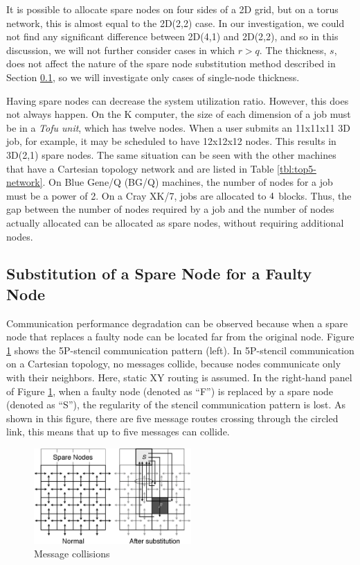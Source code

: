 \documentclass[Afour,times,sagev]{sagej}
\begin{document}
It is possible to allocate spare nodes on four sides of a 2D grid, but
on a torus network, this is almost equal to the 2D(2,2) case. In our
investigation, we could not find any significant difference between
2D(4,1) and 2D(2,2), and so in this discussion, we will not further
consider cases in which $r > q$. The thickness, $s$, does not affect
the nature of the spare node substitution method described in Section
\ref{sec:substitution}, so we will investigate only cases of
single-node thickness.

Having spare nodes can decrease the system utilization ratio. However,
this does not always happen. On the K computer, the size of each
dimension of a job must be in a {\it Tofu unit}, which has twelve
nodes. When a user submits an 11x11x11 3D job, for example, it may be
scheduled to have 12x12x12 nodes. This results in 3D(2,1) spare
nodes. The same situation can be seen with the other machines that
have a Cartesian topology network and are listed in Table
\ref{tbl:top5-network}. On Blue Gene/Q (BG/Q) machines, the number of
nodes for a job must be a power of 2\citep{BGQ-admin}. On a Cray XK/7,
jobs are allocated to $4 \time 2 \time 8$
blocks\citep{Pena:2013:ATM:2488551.2488564}. Thus, the gap between the
number of nodes required by a job and the number of nodes actually
allocated can be allocated as spare nodes, without requiring
additional nodes.

\subsection{Substitution of a Spare Node for a Faulty Node}
\label{sec:substitution}

Communication performance degradation can be observed because when a
spare node that replaces a faulty node can be located far from the
original node. Figure \ref{fig:collisions} shows the 5P-stencil
communication pattern (left). In 5P-stencil communication on a
Cartesian topology, no messages collide, because nodes communicate
only with their neighbors. Here, static XY routing is assumed. In the
right-hand panel of Figure \ref{fig:collisions}, when a faulty node
(denoted as ``F'') is replaced by a spare node (denoted as ``S''), the
regularity of the stencil communication pattern is lost. As shown in
this figure, there are five message routes crossing through the
circled link, this means that up to five messages can collide.

\begin{figure}[ht]
\centering
\includegraphics[width=60mm]{Figs/Collision.eps}
  \caption{Message collisions}
  \label{fig:collisions}
\end{figure}
\end{document}

